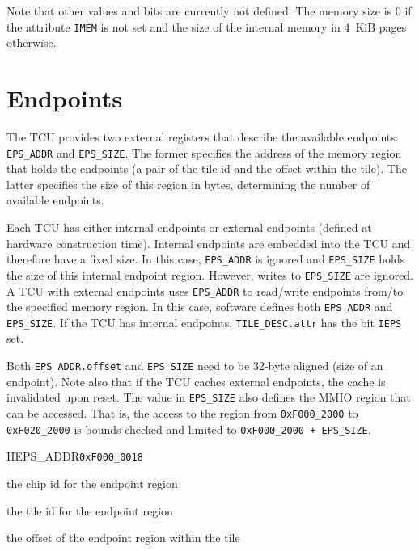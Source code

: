 \noindent Note that other values and bits are currently not defined. The memory size is 0 if the
attribute \texttt{IMEM} is not set and the size of the internal memory in 4~KiB pages otherwise.

\section{Endpoints}

The TCU provides two external registers that describe the available endpoints: \texttt{EPS\_ADDR}
and \texttt{EPS\_SIZE}. The former specifies the address of the memory region that holds the
endpoints (a pair of the tile id and the offset within the tile). The latter specifies the size of
this region in bytes, determining the number of available endpoints.

Each TCU has either internal endpoints or external endpoints (defined at hardware construction
time). Internal endpoints are embedded into the TCU and therefore have a fixed size. In this case,
\texttt{EPS\_ADDR} is ignored and \texttt{EPS\_SIZE} holds the size of this internal endpoint
region. However, writes to \texttt{EPS\_SIZE} are ignored. A TCU with external endpoints uses
\texttt{EPS\_ADDR} to read/write endpoints from/to the specified memory region. In this case,
software defines both \texttt{EPS\_ADDR} and \texttt{EPS\_SIZE}. If the TCU has internal endpoints,
\texttt{TILE\_DESC.attr} has the bit \texttt{IEPS} set.

Both \texttt{EPS\_ADDR.offset} and \texttt{EPS\_SIZE} need to be 32-byte aligned (size of an
endpoint). Note also that if the TCU caches external endpoints, the cache is invalidated upon reset.
The value in \texttt{EPS\_SIZE} also defines the MMIO region that can be accessed. That is, the
access to the region from \texttt{0xF000\_2000} to \texttt{0xF020\_2000} is bounds checked and
limited to \texttt{0xF000\_2000 + EPS\_SIZE}.

\begin{register}{H}{EPS\_ADDR}{\texttt{0xF000\_0018}}
  \regnewline%
  \begin{regdesc}\begin{reglist}
    \item[chip] the chip id for the endpoint region
    \item[tile] the tile id for the endpoint region
    \item[offset] the offset of the endpoint region within the tile
  \end{reglist}\end{regdesc}
\end{register}


